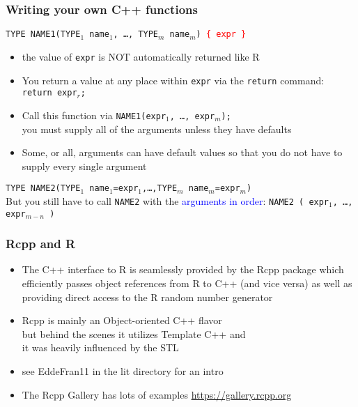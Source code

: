 \documentclass[11pt,pdftex,dvipsnames,usenames,helvetica]{beamer}
\begin{document}
\begin{frame}
\frametitle{Writing your own C++ functions }

{\tt TYPE NAME1(TYPE$_1$ name$_1$, \dots, TYPE$_m$ name$_m$) 
\textcolor{red}{\{ expr \}} } 
\begin{itemize}
\item the value of {\tt expr} is NOT automatically returned like R
\item You return a value at any place within {\tt expr}
via the {\tt return} command: {\tt return expr$_r$;}
\item Call this function via {\tt NAME1(expr$_1$, \dots, expr$_m$);}\\
you must supply all of the arguments unless they have defaults
\item Some, or all, arguments can have default values so that you do not 
have to supply every single argument
\end{itemize}
{\tt TYPE NAME2(TYPE$_1$  name$_1$=expr$_1$,\dots,TYPE$_m$ name$_m$=expr$_{m}$)} \\
But you still have to call {\tt NAME2}
with the \textcolor{blue}{ arguments in order}: 
{\tt NAME2 ( expr$_1$, \dots, expr$_{m-n}$ )  } \\
\end{frame}

\begin{frame}[fragile]
\frametitle{Rcpp and R}

\begin{itemize}
\item The {C++} interface to
{R} is seamlessly provided by the {Rcpp} package
 which efficiently passes object references from
{R} to {C++} (and vice versa) as well as providing
direct access to the {R} random number generator
\item Rcpp is mainly an Object-oriented C++ flavor\\
but behind the scenes it utilizes Template C++ and\\ it was heavily
influenced by the STL
\item see EddeFran11 in the lit directory for an intro
\item The Rcpp Gallery has lots of examples \url{https://gallery.rcpp.org}
\end{itemize}
\end{frame}
\end{document}
